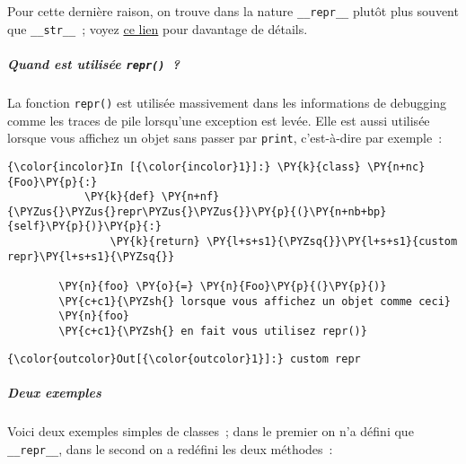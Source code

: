     Pour cette dernière raison, on trouve dans la nature
\texttt{\_\_repr\_\_} plutôt plus souvent que \texttt{\_\_str\_\_}~;
voyez
\href{https://docs.python.org/3/reference/datamodel.html\#object.__repr__}{ce
lien} pour davantage de détails.

    \hypertarget{quand-est-utilisuxe9e-repr}{%
\subparagraph{\texorpdfstring{Quand est utilisée
\texttt{repr()}~?}{Quand est utilisée repr()~?}}\label{quand-est-utilisuxe9e-repr}}

    La fonction \texttt{repr()} est utilisée massivement dans les
informations de debugging comme les traces de pile lorsqu'une exception
est levée. Elle est aussi utilisée lorsque vous affichez un objet sans
passer par \texttt{print}, c'est-à-dire par exemple~:

    \begin{Verbatim}[commandchars=\\\{\},frame=single,framerule=0.3mm,rulecolor=\color{cellframecolor}]
{\color{incolor}In [{\color{incolor}1}]:} \PY{k}{class} \PY{n+nc}{Foo}\PY{p}{:} 
            \PY{k}{def} \PY{n+nf}{\PYZus{}\PYZus{}repr\PYZus{}\PYZus{}}\PY{p}{(}\PY{n+nb+bp}{self}\PY{p}{)}\PY{p}{:}
                \PY{k}{return} \PY{l+s+s1}{\PYZsq{}}\PY{l+s+s1}{custom repr}\PY{l+s+s1}{\PYZsq{}}
            
        \PY{n}{foo} \PY{o}{=} \PY{n}{Foo}\PY{p}{(}\PY{p}{)}
        \PY{c+c1}{\PYZsh{} lorsque vous affichez un objet comme ceci}
        \PY{n}{foo}
        \PY{c+c1}{\PYZsh{} en fait vous utilisez repr()}
\end{Verbatim}


\begin{Verbatim}[commandchars=\\\{\},frame=single,framerule=0.3mm,rulecolor=\color{cellframecolor}]
{\color{outcolor}Out[{\color{outcolor}1}]:} custom repr
\end{Verbatim}
            
    \hypertarget{deux-exemples}{%
\subparagraph{Deux exemples}\label{deux-exemples}}

    Voici deux exemples simples de classes~; dans le premier on n'a défini
que \texttt{\_\_repr\_\_}, dans le second on a redéfini les deux
méthodes~:

